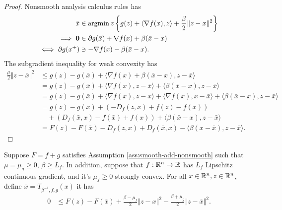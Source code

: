 \documentclass[12pt]{report}
\begin{document}
    \begin{proof}
        Nonsmooth analysis calculus rules has 
        \begin{align*}
            \bar x &\in \mathop{\rm argmin}\limits{z} \left\lbrace
                g(z) + \langle \nabla f(x), z\rangle + \frac{\beta}{2}\Vert z - x\Vert^2
            \right\rbrace
            \\
            \implies
            \mathbf 0 
            &\in \partial g(\bar x) + \nabla f(x) + \beta(\bar x - x)
            \\
            \iff 
            \partial g(x^+) &\ni
            - \nabla f(x) - \beta(\bar x - x). 
        \end{align*}
        The subgradient inequality for weak convexity has 
        \begin{align*}
            \frac{\mu}{2}\Vert z - \bar x\Vert^2 
            &\le 
            g(z) - g(\bar x) + \langle \nabla f(x) + \beta(\bar x - x), z - \bar x\rangle
            \\
            &= 
            g(z) - g(\bar x) + \langle \nabla f(x), z - \bar x\rangle + \langle \beta(\bar x - x), z - \bar x\rangle
            \\
            &= g(z) - g(\bar x) + \langle \nabla f(x), z - x\rangle
            + \langle \nabla f(x), x - \bar x\rangle
            + \langle \beta(\bar x - x), z - \bar x\rangle
            \\
            &= 
            g(z) - g(\bar x) 
            + (-D_f(z, x) + f(z) - f(x))
            \\
            & \quad 
            + (D_f(\bar x, x) - f(\bar x) + f(x))
            + \langle \beta(\bar x - x), z - \bar x\rangle
            \\
            &= F(z) - F(\bar x) - D_f(z, x) + D_f(\bar x, x) 
            - \langle \beta(x - \bar x), z - \bar x\rangle. 
        \end{align*}
    \end{proof}
    \begin{theorem}\label{thm:cnvx-pg-ineq}
        Suppose $F = f + g$ satisfies Assumption \ref{ass:smooth-add-nonsmooth} such that $\mu = \mu_g \ge 0$, $\beta \ge L_f$. 
        In addition, suppose that $f:\mathbb R^n\rightarrow \mathbb R$ has $L_f$ Lipschitz continuous gradient, and it's $\mu_f \ge 0$ strongly convex. 
        For all $x \in \mathbb R^n, z \in \mathbb R^n$, define $\bar x = T_{\beta^{-1}, f, g}(x)$ it has 
        \begin{align*}
            0 &\le 
            F(z) - F(\bar x) + 
            \frac{\beta - \mu_f}{2}\Vert z - x\Vert^2
            - \frac{\beta + \mu_g}{2}\Vert z - \bar x\Vert^2. 
        \end{align*}
    \end{theorem}
\end{document}
